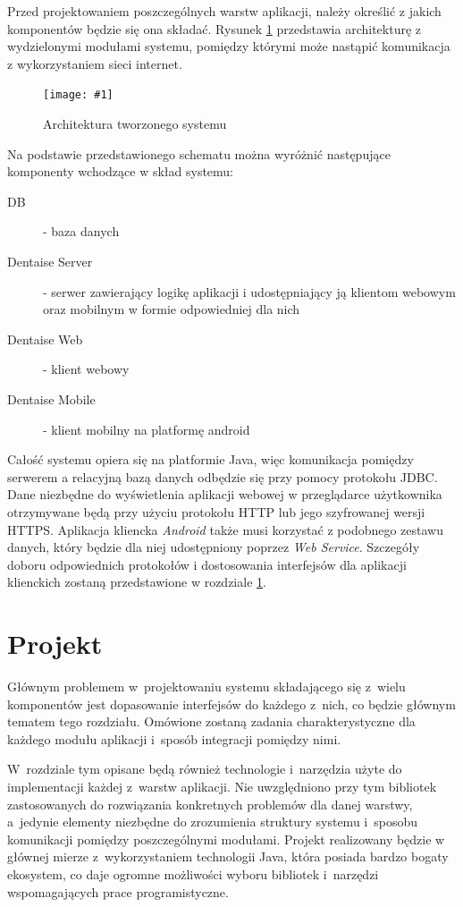 \documentclass[11pt]{aghdpl}
\newcommand{\fullWidthPicture}[2]{
\begin{figure}[h!]
	\centering
		\texttt{[image: \#1]}
	\caption{#2}
	\label{fig:#1}
\end{figure}
}
\begin{document}
Przed projektowaniem poszczególnych warstw aplikacji, należy określić z jakich komponentów będzie się ona składać. Rysunek \ref{fig:architektura} przedstawia architekturę z wydzielonymi modułami systemu, pomiędzy którymi może nastąpić komunikacja z wykorzystaniem sieci internet.

\fullWidthPicture{architektura}{Architektura tworzonego systemu}

Na podstawie przedstawionego schematu można wyróżnić następujące komponenty wchodzące w skład systemu:
\begin{description}
\item[DB] - baza danych
\item[Dentaise Server] - serwer zawierający logikę aplikacji i udostępniający ją klientom webowym oraz mobilnym w formie odpowiedniej dla nich
\item[Dentaise Web] - klient webowy
\item[Dentaise Mobile] - klient mobilny na platformę android
\end{description}

Całość systemu opiera się na platformie Java, więc komunikacja pomiędzy serwerem a relacyjną bazą danych odbędzie się przy pomocy protokołu JDBC. Dane niezbędne do wyświetlenia aplikacji webowej w przeglądarce użytkownika otrzymywane będą przy użyciu protokołu HTTP lub jego szyfrowanej wersji HTTPS. Aplikacja kliencka \emph{Android} także musi korzystać z podobnego zestawu danych, który będzie dla niej udostępniony poprzez \emph{Web Service}. Szczegóły doboru odpowiednich protokołów i dostosowania interfejsów dla aplikacji klienckich zostaną przedstawione w rozdziale \ref{cha:dobor_technologii_i_narzedzi}. 


\chapter{Projekt}
\label{cha:dobor_technologii_i_narzedzi}

Głównym problemem w~projektowaniu systemu składającego się z~wielu komponentów jest dopasowanie interfejsów do każdego z~nich, co będzie głównym tematem tego rozdziału. Omówione zostaną zadania charakterystyczne dla każdego modułu aplikacji i~sposób integracji pomiędzy nimi.

W~rozdziale tym opisane będą również technologie i~narzędzia użyte do implementacji każdej z~warstw aplikacji. Nie uwzględniono przy tym bibliotek zastosowanych do rozwiązania konkretnych problemów dla danej warstwy, a~jedynie elementy niezbędne do zrozumienia struktury systemu i~sposobu komunikacji pomiędzy poszczególnymi modułami. Projekt realizowany będzie w głównej mierze z~wykorzystaniem technologii Java, która posiada bardzo bogaty ekosystem, co daje ogromne możliwości wyboru bibliotek i~narzędzi wspomagających prace programistyczne.
\end{document}
